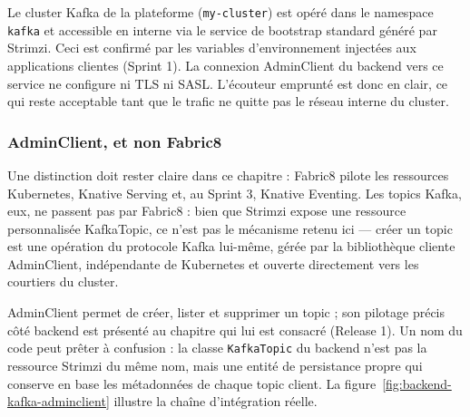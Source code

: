 Le cluster Kafka de la plateforme (\texttt{my-cluster}) est opéré dans le namespace \texttt{kafka} et accessible en interne via le service de bootstrap standard généré par Strimzi. Ceci est confirmé par les variables d'environnement injectées aux applications clientes (Sprint 1). La connexion AdminClient du backend vers ce service ne configure ni TLS ni SASL. L'écouteur emprunté est donc en clair, ce qui reste acceptable tant que le trafic ne quitte pas le réseau interne du cluster.

\subsubsection{AdminClient, et non Fabric8}
\label{sec:kafka-adminclient}

Une distinction doit rester claire dans ce chapitre : Fabric8 pilote les ressources Kubernetes, Knative Serving et, au Sprint 3, Knative Eventing. Les topics Kafka, eux, ne passent pas par Fabric8 : bien que Strimzi expose une ressource personnalisée KafkaTopic, ce n'est pas le mécanisme retenu ici — créer un topic est une opération du protocole Kafka lui-même, gérée par la bibliothèque cliente AdminClient, indépendante de Kubernetes et ouverte directement vers les courtiers du cluster.

AdminClient permet de créer, lister et supprimer un topic ; son pilotage précis côté backend est présenté au chapitre qui lui est consacré (Release 1). Un nom du code peut prêter à confusion : la classe \texttt{KafkaTopic} du backend n'est pas la ressource Strimzi du même nom, mais une entité de persistance propre qui conserve en base les métadonnées de chaque topic client. La figure~\ref{fig:backend-kafka-adminclient} illustre la chaîne d'intégration réelle.

